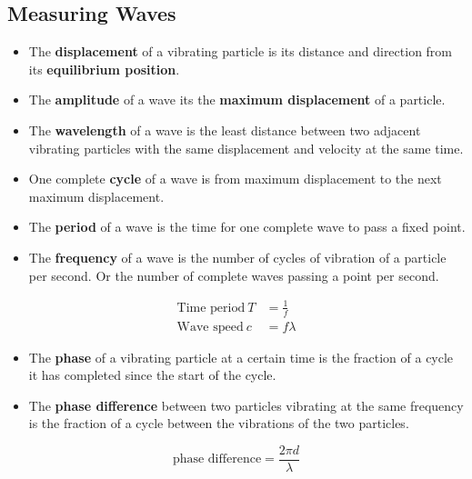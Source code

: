 \subsection{Measuring Waves}
\begin{itemize}
    \item The \textbf{displacement} of a vibrating particle is its distance and direction from its \textbf{equilibrium position}.
    \item The \textbf{amplitude} of a wave its the \textbf{maximum displacement} of a particle.
    \item The \textbf{wavelength} of a wave is the least distance between two adjacent vibrating particles with the same displacement and velocity at the same time.
    \item One complete \textbf{cycle} of a wave is from maximum displacement to the next maximum displacement.
    \item The \textbf{period} of a wave is the time for one complete wave to pass a fixed point.
    \item The \textbf{frequency} of a wave is the number of cycles of vibration of a particle per second. Or the number of complete waves passing a point per second.
\end{itemize}
\begin{align*}
    \text{Time period}\ T&=\frac{1}{f}\\
    \text{Wave speed}\ c&=f\lambda
\end{align*}

\begin{itemize}
    \item The \textbf{phase} of a vibrating particle at a certain time is the fraction of a cycle it  has completed since the start of the cycle.
    \item The \textbf{phase difference} between two particles vibrating at the same frequency is the fraction of a cycle between the vibrations of the two particles.
\end{itemize}
$$\text{phase difference}=\frac{2\pi d}{\lambda}$$
